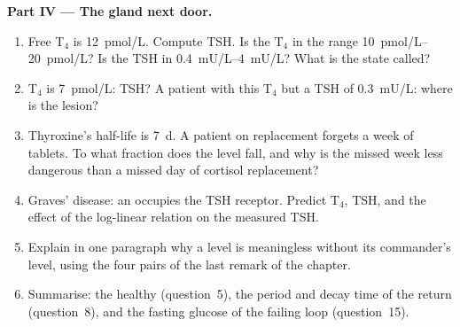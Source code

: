 \begin{problem}
\medskip
\noindent\textbf{Part IV --- The gland next door.}
\begin{enumerate}[resume]
  \item Free T$_{4}$ is \qty{12}{pmol/L}. Compute TSH. Is the T$_{4}$ in
        the range \qtyrange{10}{20}{pmol/L}? Is the TSH in
        \qtyrange{0.4}{4}{mU/L}? What is the state called?
  \item T$_{4}$ is \qty{7}{pmol/L}: TSH? A patient with this T$_{4}$ but
        a TSH of \qty{0.3}{mU/L}: where is the lesion?
  \item Thyroxine's half-life is \qty{7}{d}. A patient on replacement
        forgets a week of tablets. To what fraction does the level fall,
        and why is the missed week less dangerous than a missed day of
        cortisol replacement?
  \item Graves' disease: an  occupies the TSH receptor. Predict
        T$_{4}$, TSH, and the effect of the log-linear relation on the
        measured TSH.
  \item Explain in one paragraph why a  level is meaningless
        without its commander's level, using the four pairs of the last
        remark of the chapter.
  \item Summarise: the healthy  (question~5), the period and
        decay time of the return (question~8), and the fasting glucose
        of the failing loop (question~15).
\end{enumerate}
\end{problem}
